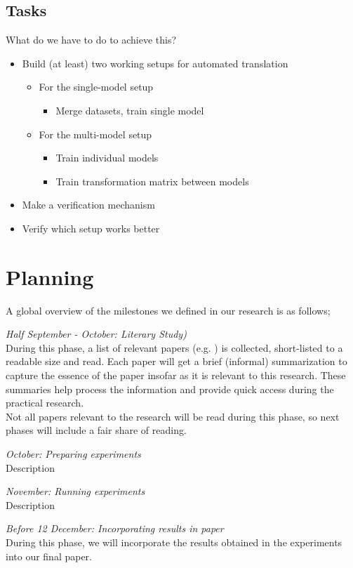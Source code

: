 \subsection{Tasks}
What do we have to do to achieve this?
\begin{itemize}
  \item Build (at least) two working setups for automated translation
    \begin{itemize}
      \item For the single-model setup
      \begin{itemize}
        \item Merge datasets, train single model
      \end{itemize}
      \item For the multi-model setup
      \begin{itemize}
        \item Train individual models
        \item Train transformation matrix between models
      \end{itemize}
    \end{itemize}
  \item Make a verification mechanism
  \item Verify which setup works better
\end{itemize}

\section{Planning}
A global overview of the milestones we defined in our research is as follows;
\begin{description}
  \item \emph{Half September - October: Literary Study)}\\
    During this phase, a list of relevant papers (e.g. \cite{levy2014linguistic, mikolov2013exploiting, wolf2014joint}) is collected, short-listed to a readable size and read. Each paper will get a brief (informal) summarization to capture the essence of the paper insofar as it is relevant to this research. These summaries help process the information and provide quick access during the practical research.\\

    Not all papers relevant to the research will be read during this phase, so next phases will include a fair share of reading.
  \item \emph{October: Preparing experiments}\\
    Description
  \item \emph{November: Running experiments}\\
    Description
  \item \emph{Before 12 December: Incorporating results in paper}\\
    During this phase, we will incorporate the results obtained in the experiments into our final paper.
\end{description}


